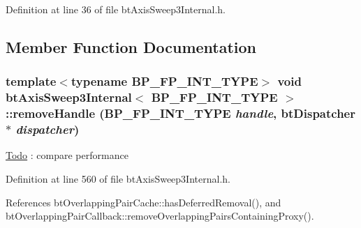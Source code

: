 Definition at line 36 of file btAxisSweep3Internal.h.

\subsection{Member Function Documentation}
\hypertarget{classbt_axis_sweep3_internal_4e26f4f8acf63f26451f6396223001bb}{
\subsubsection[removeHandle]{\setlength{\rightskip}{0pt plus 5cm}template$<$typename BP\_\-FP\_\-INT\_\-TYPE$>$ void {\bf btAxisSweep3Internal}$<$ BP\_\-FP\_\-INT\_\-TYPE $>$::removeHandle (BP\_\-FP\_\-INT\_\-TYPE {\em handle}, \/  {\bf btDispatcher} $\ast$ {\em dispatcher})}}
\label{classbt_axis_sweep3_internal_4e26f4f8acf63f26451f6396223001bb}




\begin{Desc}
\item[\hyperlink{todo__todo000008}{Todo}]: compare performance \end{Desc}


Definition at line 560 of file btAxisSweep3Internal.h.

References btOverlappingPairCache::hasDeferredRemoval(), and btOverlappingPairCallback::removeOverlappingPairsContainingProxy().

